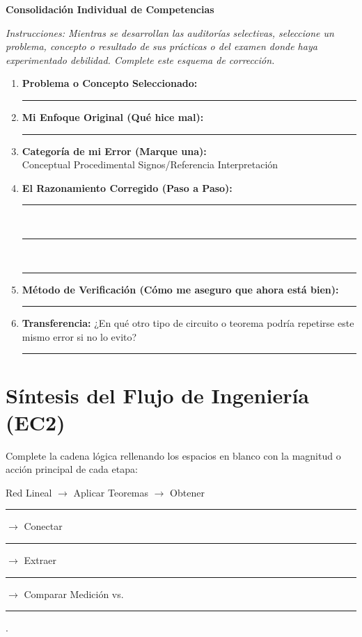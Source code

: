 \documentclass[11pt, a4paper]{article}
\begin{document}
\begin{tcolorbox}[colback=ucbblue!5!white, colframe=ucbblue, title=\textbf{Actividad Paralela: Tarea de Corrección y Reflexión EC2}]
    \centering \textbf{Consolidación Individual de Competencias}
\end{tcolorbox}

\noindent\textit{Instrucciones: Mientras se desarrollan las auditorías selectivas, seleccione un problema, concepto o resultado de sus prácticas o del examen donde haya experimentado debilidad. Complete este esquema de corrección.}

\vspace{0.4cm}
\begin{enumerate}
    \item \textbf{Problema o Concepto Seleccionado:} \\
    \rule{\textwidth}{0.4pt}
    
    \item \textbf{Mi Enfoque Original (Qué hice mal):} \\
    \rule{\textwidth}{0.4pt}
    
    \item \textbf{Categoría de mi Error (Marque una):} \\
    [ ] Conceptual \quad [ ] Procedimental \quad [ ] Signos/Referencia \quad [ ] Interpretación
    
    \item \textbf{El Razonamiento Corregido (Paso a Paso):} \\
    \rule{\textwidth}{0.4pt} \\
    \rule{\textwidth}{0.4pt} \\
    \rule{\textwidth}{0.4pt}
    
    \item \textbf{Método de Verificación (Cómo me aseguro que ahora está bien):} \\
    \rule{\textwidth}{0.4pt}
    
    \item \textbf{Transferencia:} ¿En qué otro tipo de circuito o teorema podría repetirse este mismo error si no lo evito? \\
    \rule{\textwidth}{0.4pt}
\end{enumerate}

\vspace{0.5cm}
\section*{Síntesis del Flujo de Ingeniería (EC2)}
Complete la cadena lógica rellenando los espacios en blanco con la magnitud o acción principal de cada etapa:

\vspace{0.2cm}
Red Lineal $\rightarrow$ Aplicar Teoremas $\rightarrow$ Obtener \rule{3cm}{0.4pt} $\rightarrow$ Conectar \rule{3cm}{0.4pt} $\rightarrow$ Extraer \rule{3cm}{0.4pt} $\rightarrow$ Comparar Medición vs. \rule{3cm}{0.4pt}.
\end{document}
